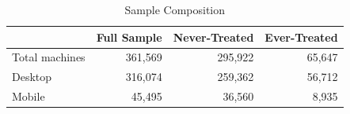 \begin{table}[h!]
\centering
\caption{Sample Composition}
\label{tab:sample_counts}
\begin{tabular}{lrrr}
\toprule
 & Full Sample & Never-Treated & Ever-Treated \\
\midrule
Total machines & 361,569 & 295,922 & 65,647 \\
\quad Desktop & 316,074 & 259,362 & 56,712 \\
\quad Mobile & 45,495 & 36,560 & 8,935 \\
\bottomrule
\end{tabular}
\end{table}
